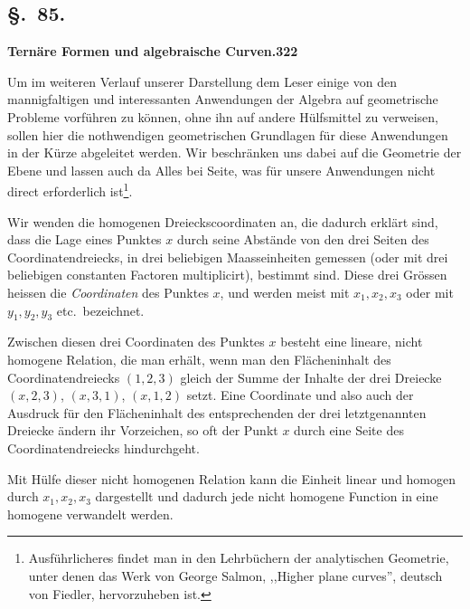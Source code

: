 \documentclass[12pt,a4paper]{article}
\begin{document}
\subsection*{\S.~85.}
\textbf{Tern\"are Formen und algebraische Curven.}\hfill\textbf{322}\\[4pt]

Um im weiteren Verlauf unserer Darstellung dem Leser einige von den mannigfaltigen und interessanten Anwendungen der Algebra auf geometrische Probleme vorf\"uhren zu k\"onnen, ohne ihn auf andere H\"ulfsmittel zu verweisen, sollen hier die nothwendigen geometrischen Grundlagen f\"ur diese Anwendungen in der K\"urze abgeleitet werden. Wir beschr\"anken uns dabei auf die Geometrie der Ebene und lassen auch da Alles bei Seite, was f\"ur unsere Anwendungen nicht direct erforderlich ist\footnote{Ausf\"uhrlicheres findet man in den Lehrb\"uchern der analytischen Geometrie, unter denen das Werk von George Salmon, ,,Higher plane curves'', deutsch von Fiedler, hervorzuheben ist.}.

Wir wenden die homogenen Dreieckscoordinaten an, die dadurch erkl\"art sind, dass die Lage eines Punktes $x$ durch seine Abst\"ande von den drei Seiten des Coordinatendreiecks, in drei beliebigen Maasseinheiten gemessen (oder mit drei beliebigen constanten Factoren multiplicirt), bestimmt sind. Diese drei Gr\"ossen heissen die \emph{Coordinaten} des Punktes $x$, und werden meist mit $x_1,x_2,x_3$ oder mit $y_1,y_2,y_3$ etc.\ bezeichnet.

Zwischen diesen drei Coordinaten des Punktes $x$ besteht eine lineare, nicht homogene Relation, die man erh\"alt, wenn man den Fl\"acheninhalt des Coordinatendreiecks $(1,2,3)$ gleich der Summe der Inhalte der drei Dreiecke $(x,2,3)$, $(x,3,1)$, $(x,1,2)$ setzt. Eine Coordinate und also auch der Ausdruck f\"ur den Fl\"acheninhalt des entsprechenden der drei letztgenannten Dreiecke \"andern ihr Vorzeichen, so oft der Punkt $x$ durch eine Seite des Coordinatendreiecks hindurchgeht.

Mit H\"ulfe dieser nicht homogenen Relation kann die Einheit linear und homogen durch $x_1,x_2,x_3$ dargestellt und dadurch jede nicht homogene Function in eine homogene verwandelt werden.
\end{document}
